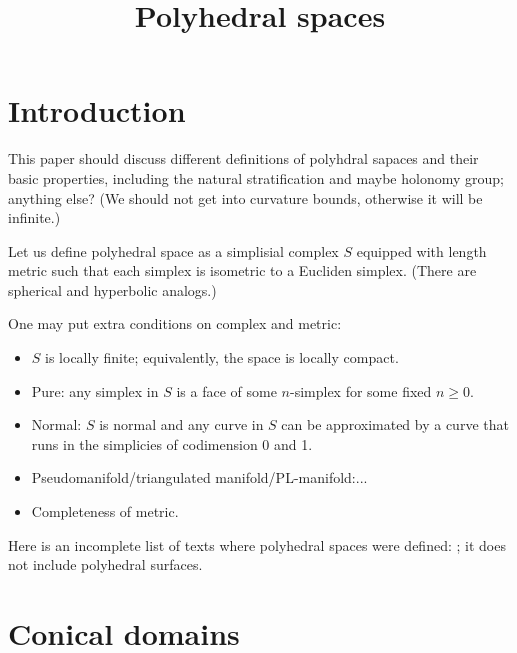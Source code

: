 \documentclass[a4paper,10pt]{article}
\def\thetitle{Polyhedral spaces}
\def\theauthors{}
\begin{document}


\title{\thetitle}
\author{\theauthors}
\date{}
\maketitle

\begin{abstract}

\end{abstract}

\section{Introduction}

This paper should discuss different definitions of polyhdral sapaces and their basic properties, including the natural stratification and maybe holonomy group; anything else?
(We should not get into curvature bounds, otherwise it will be infinite.)

Let us define polyhedral space as a simplisial complex $S$ equipped with length metric such that each simplex is isometric to a Eucliden simplex.
(There are spherical and hyperbolic analogs.)

One may put extra conditions on complex and metric:
\begin{itemize}
\item $S$ is locally finite; equivalently, the space is locally compact.
\item Pure: any simplex in $S$ is a face of some $n$-simplex for some fixed $n\ge 0$.
\item Normal: $S$ is normal and any curve in $S$ can be approximated by a curve that runs in the simplicies of codimension 0 and 1.
\item Pseudomanifold/triangulated manifold/PL-manifold:...
\item Completeness of metric.
\end{itemize}

Here is an incomplete list of texts where polyhedral spaces were defined: \cite{alexander-kapovitch-petrunin2019,alexander-kapovitch-petrunin2024,botero-gil-sombra,burago-burago-ivanov,lebedeva-petrunin,milka1968,milka1969,minemyer2015,bridson-haefliger,panov2009}; it does not include polyhedral surfaces.

\section{Conical domains}
\end{document}
